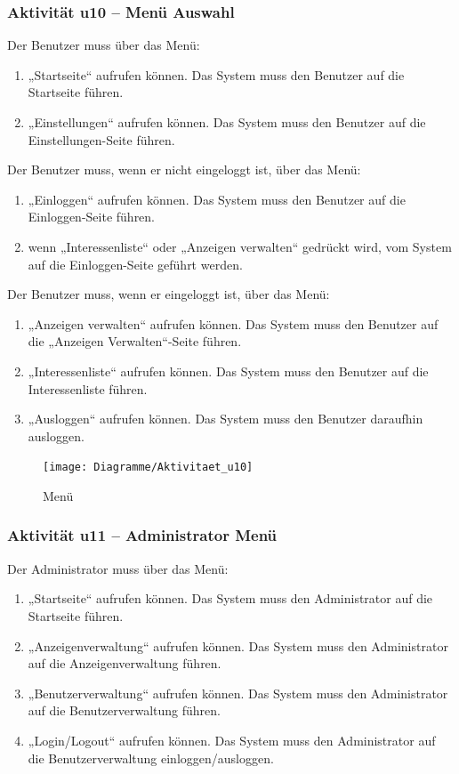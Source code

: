 \documentclass[a4paper,12pt,oneside]{scrartcl}
\begin{document}
\subsubsection{Aktivität u10 – Menü Auswahl}
Der Benutzer muss über das Menü:
\begin{enumerate}
	\item „Startseite“ aufrufen können. Das System muss den Benutzer auf die Startseite führen.
	\item „Einstellungen“ aufrufen können. Das System muss den Benutzer auf die Einstellungen-Seite führen.
\end{enumerate}
Der Benutzer muss, wenn er nicht eingeloggt ist, über das Menü:
\begin{enumerate}
	\item „Einloggen“ aufrufen können. Das System muss den Benutzer auf die Einloggen-Seite führen.
	\item wenn „Interessenliste“ oder „Anzeigen verwalten“ gedrückt wird, vom System auf die Einloggen-Seite geführt werden.
\end{enumerate}
Der Benutzer muss, wenn er eingeloggt ist, über das Menü:
\begin{enumerate}
	\item „Anzeigen verwalten“ aufrufen können. Das System muss den Benutzer auf die „Anzeigen Verwalten“-Seite führen.
	\item „Interessenliste“ aufrufen können. Das System muss den Benutzer auf die Interessenliste führen.
	\item „Ausloggen“ aufrufen können. Das System muss den Benutzer daraufhin ausloggen.
\end{enumerate}

\begin{figure}[!htbp]
\centering
\noindent\texttt{[image: Diagramme/Aktivitaet\_u10]}
\caption{Menü}
\end{figure}
\FloatBarrier

\subsubsection{Aktivität u11 – Administrator Menü}
Der Administrator muss über das Menü:

\begin{enumerate}
	\item „Startseite“ aufrufen können. Das System muss den Administrator auf die Startseite führen.
	\item „Anzeigenverwaltung“ aufrufen können. Das System muss den Administrator auf die Anzeigenverwaltung führen.
	\item „Benutzerverwaltung“ aufrufen können. Das System muss den Administrator auf die Benutzerverwaltung führen.
	\item „Login/Logout“ aufrufen können. Das System muss den Administrator auf die Benutzerverwaltung einloggen/ausloggen.
\end{enumerate}
\end{document}
